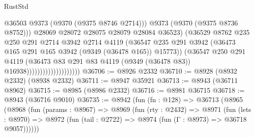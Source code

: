 \begin{lexlean}{RustStd}
\begin{coremodule}
{\begin{coremodule}
{{{{{{{{{{{{{{{{{{{{{{{{{{{{{{{{{{{{{{{                                            @36503
                                            @9373
                                            (@9370 (@9375 @8746 @2714)))
                                          @9373
                                          (@9370 (@9375 @8736 @8752)))
                                        @28069
                                        @28072
                                        @28075
                                        @28079
                                        @28084
                                        @36523)
                                      (@36529
                                        @8762
                                        @235
                                        @250
                                        @291
                                        @2714
                                        @3942
                                        @2714
                                        @4119
                                        (@36547
                                          @235
                                          @291
                                          @3942
                                          (@36473
                                            @165
                                            @291
                                            @165
                                            @3942
                                            (@9349 (@36478 @165))
                                            @15773))
                                        (@36547
                                          @250
                                          @291
                                          @4119
                                          (@36473
                                            @83
                                            @291
                                            @83
                                            @4119
                                            (@9349 (@36478 @83))
                                            @16938))))))))))))))))))))
@36706 := @8926 @2332
@36710 := @8928 (@8932 @2332) (@8938 @2332)
@36711 := @8947 @35921
@36713 := @8943 (@36711 @8962)
@36715 := @8985 (@8986 @2332)
@36716 := @8981 @36715
@36718 := @8943 (@36716 @9010)
@36735 := @8942
    (fun (fn : @128) =>
    @36713
      (@8965
        (@8968
          (fun (params : @8967) =>
          @8969
            (fun (rty : @2432) =>
            @8971
              (fun (lets : @8970) =>
              @8972 (fun (tail : @2722) => @8974 (fun (Γ : @8973) => @36718 @9057))))))
}}}}}}}}}}}}}}}}}}}}}}}}}}}}}}}}}}}}}}}
\end{coremodule}}
\end{coremodule}
\end{lexlean}
